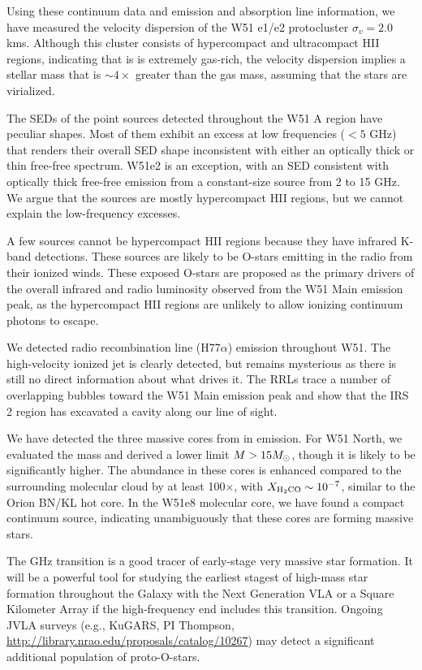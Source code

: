Using these continuum data and \formaldehyde emission and absorption line
information, we have measured the velocity dispersion of the W51 e1/e2
protocluster $\sigma_v=2.0$ kms.  Although this cluster consists of
hypercompact and ultracompact HII regions, indicating that is is extremely
gas-rich, the velocity dispersion implies a stellar mass that is $\sim4\times$
greater than the gas mass, assuming that the stars are virialized.

The SEDs of the point sources detected throughout the W51 A region have
peculiar shapes.  Most of them exhibit an excess at low frequencies ($<5$ GHz)
that renders their overall SED shape inconsistent with either an optically
thick or thin free-free spectrum.  W51e2 is an exception, with an SED
consistent with optically thick free-free emission from a constant-size source
from 2 to 15 GHz.  We argue that the sources are mostly hypercompact HII
regions, but we cannot explain the low-frequency excesses.

A few sources cannot be hypercompact HII regions because they have infrared
K-band detections.  These sources are likely to be O-stars emitting in the
radio from their ionized winds.  These exposed O-stars are proposed as the
primary drivers of the overall infrared and radio luminosity observed from the
W51 Main emission peak, as the hypercompact HII regions are unlikely to allow
ionizing continuum photons to escape.

We detected radio recombination line (H77$\alpha$) emission throughout W51.
The \citet{Lacy2007a} high-velocity ionized jet is clearly detected, but
remains mysterious as there is still no direct information about what drives
it.  The RRLs trace a number of overlapping bubbles toward the W51 Main
emission peak and show that the IRS 2 region has excavated a cavity along our
line of sight.

We have detected the three massive cores from \citet{Zhang1997a} in
\formaldehyde \twotwo emission.  For W51 North, we evaluated the mass and
derived a lower limit $M>15 M_{\odot}$, though it is likely to be significantly
higher.  The \formaldehyde abundance in these cores is enhanced compared to the
surrounding molecular cloud by at least 100$\times$, with $X_{\textrm{H}_2\textrm{CO}}
\sim 10^{-7}$, similar to the Orion BN/KL hot core.  In the W51e8 molecular
core, we have found a compact continuum source, indicating unambiguously that
these cores are forming massive stars.

The \formaldehyde {} GHz transition is a good tracer of early-stage
very massive star formation.  It will be a powerful tool for studying the earliest
stagest of high-mass star formation throughout the Galaxy with the Next Generation VLA
or a Square Kilometer Array if the high-frequency end includes this transition.
Ongoing JVLA surveys (e.g., KuGARS, PI Thompson,
\url{http://library.nrao.edu/proposals/catalog/10267}) may detect a significant
additional population of proto-O-stars.





